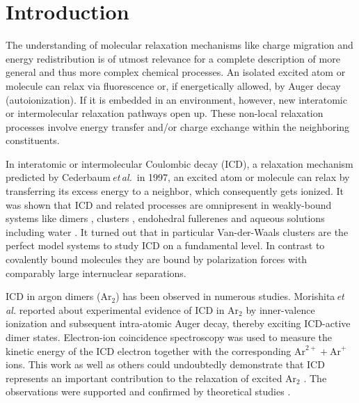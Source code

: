\documentclass[%
 aip,
rsi,%
 amsmath,amssymb,
preprint,%
]{revtex4-1}
\begin{document}
\maketitle


\section{Introduction}
 \label{sec:introduction} 

The understanding of molecular relaxation mechanisms like charge migration and energy redistribution is of utmost relevance for a complete description of more general and thus more complex chemical processes. An isolated excited atom or molecule can relax via fluorescence or, if energetically allowed, by Auger decay (autoionization). If it is embedded in an environment, however, new interatomic or intermolecular relaxation pathways open up. 
These non-local relaxation processes involve energy transfer and/or charge exchange within the neighboring constituents.

In interatomic or intermolecular Coulombic decay (ICD), a relaxation mechanism predicted by Cederbaum\textit{\,et\,al.}\,\cite{Cederbaum1997} in 1997, an excited atom or molecule can relax by transferring its excess energy to a neighbor, which consequently gets ionized. It was shown that ICD and related processes \cite{Hergenhahn2011} are omnipresent in weakly-bound systems like dimers \cite{jahnke2004,schnorr2013}, clusters \cite{santra2000,marburger2003}, endohedral fullerenes \cite{averbukh2006} and aqueous solutions \cite{ohrwall2010} including water \cite{mucke2010,jahnke2010}. It turned out that in particular Van-der-Waals clusters are the perfect model systems to study ICD on a fundamental level. In contrast to covalently bound molecules they are bound by polarization forces with comparably large internuclear separations. 

ICD in argon dimers (Ar$_2$) has been observed in numerous studies. Morishita\textit{\,et\,al.} \cite{Morishita2006} reported about experimental evidence of ICD in Ar$_2$ by inner-valence ionization and subsequent intra-atomic Auger decay, thereby exciting ICD-active dimer states. Electron-ion coincidence spectroscopy was used to measure the kinetic energy of the ICD electron together with the corresponding $\mathrm{Ar}^{2+} + \mathrm{Ar}^{+}$ ions. This work as well as others could undoubtedly demonstrate that ICD represents an important contribution to the relaxation of excited Ar$_2$ \cite{Ueda2007,Lablanquie2007,Kimura2013,Kimura2013b,Ren2016,rist2017}. The observations were supported and confirmed by theoretical studies \cite{Stoychev2008,Miteva2014}.
\end{document}
